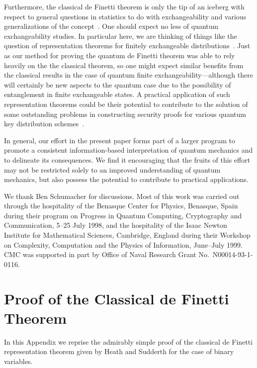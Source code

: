 Furthermore, the classical de Finetti theorem is only the tip of an
iceberg with respect to general questions in statistics to do with
exchangeability and various generalizations of the
concept~\cite{Aldous1985}.  One should expect no less of quantum
exchangeability studies.  In particular here, we are thinking of
things like the question of representation theorems for finitely
exchangeable distributions~\cite{Jaynes1986,Diaconis1977}.  Just as
our method for proving the quantum de Finetti theorem was able to
rely heavily on the the classical theorem, so one might expect
similar benefits from the classical results in the case of quantum
finite exchangeability---although there will certainly be new
aspects to the quantum case due to the possibility of entanglement
in finite exchangeable states.  A practical application of such
representation theorems could be their potential to contribute to the
solution of some outstanding problems in constructing security
proofs for various quantum key distribution
schemes~\cite{Gottesman2000}.

In general, our effort in the present paper forms part of a larger
program to promote a consistent information-based interpretation of
quantum mechanics and to delineate its consequences.  We find it
encouraging that the fruits of this effort may not be restricted
solely to an improved understanding of quantum mechanics, but also
possess the potential to contribute to practical applications.

\acknowledgments

We thank Ben Schumacher for discussions.  Most of this work was
carried out through the hospitality of the Benasque Center for
Physics, Benasque, Spain during their program on Progress in Quantum
Computing, Cryptography and Communication, 5--25 July 1998, and the
hospitality of the Isaac Newton Institute for Mathematical Sciences,
Cambridge, England during their Workshop on Complexity, Computation
and the Physics of Information, June--July 1999.  CMC was supported
in part by Office of Naval Research Grant No.~N00014-93-1-0116.

\appendix

\section{Proof of the Classical de Finetti Theorem}

In this Appendix we reprise the admirably simple proof of the
classical de Finetti representation theorem given by Heath and
Sudderth \cite{Heath1976} for the case of binary variables.

